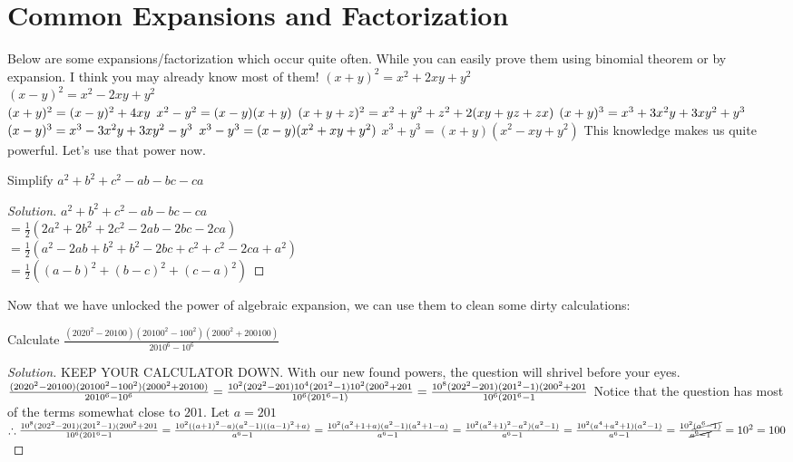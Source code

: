 \section{Common Expansions and Factorization}
Below are some expansions/factorization which occur quite often. While you can easily prove them using binomial theorem or by expansion. I think you may already know most of them!
$(x+y)^2=x^2+2xy+y^2$\\
$(x-y)^2=x^2-2xy+y^2$\\
$(x+y)^2=(x-y)^2 + 4xy\\$
$x^2-y^2=(x-y)(x+y)\\$
$(x+y+z)^2=x^2+y^2+z^2+2(xy+yz+zx)\\$
$(x+y)^3=x^3+3x^2y+3xy^2+y^3\\$
$(x-y)^3=x^3-3x^2y+3xy^2-y^3\\$
$x^3-y^3=(x-y)(x^2+xy+y^2)\\$
$x^3+y^3=(x+y)(x^2-xy+y^2)$
This knowledge makes us quite powerful. Let's use that power now.\\
\begin{example}
Simplify $a^2+b^2+c^2-ab-bc-ca$
\end{example}
\begin{proof}
    [Solution]
    $a^2+b^2+c^2-ab-bc-ca$\\
    $= \frac{1}{2}(2a^2+2b^2+2c^2-2ab-2bc-2ca)$\\
    $= \frac{1}{2}(a^2-2ab+b^2+b^2-2bc+c^2+c^2-2ca+a^2)$\\
    $= \frac{1}{2}((a-b)^2+(b-c)^2+(c-a)^2)$
\end{proof}
Now that we have unlocked the power of algebraic expansion, we can use them to clean some dirty calculations:\\
\begin{example}
    Calculate $\frac{(2020^2-20100)(20100^2-100^2)(2000^2+200100)}{2010^6-10^6}$
\end{example}
\begin{proof}
[Solution]
    KEEP YOUR CALCULATOR DOWN. With our new found powers, the  question will shrivel before your eyes.\\
    $\frac{(2020^2-20100)(20100^2-100^2)(2000^2+20100)}{2010^6-10^6}\\
    = \frac{10^2(202^2-201)10^4(201^2-1)10^2(200^2+201}{10^6(201^6-1)}\\
    = \frac{10^8(202^2-201)(201^2-1)(200^2+201}{10^6(201^6-1}\\$
    Notice that the question has most of the terms somewhat close to $201$. Let $a=201$
    $\therefore \frac{10^8(202^2-201)(201^2-1)(200^2+201}{10^6(201^6-1}\\
    = \frac{10^2((a+1)^2-a)(a^2-1)((a-1)^2+a)}{a^6-1}\\
    = \frac{10^2(a^2+1+a)(a^2-1)(a^2+1-a)}{a^6-1}\\
    = \frac{10^2(a^2+1)^2-a^2)(a^2-1)}{a^6-1}\\
    = \frac{10^2(a^4+a^2+1)(a^2-1)}{a^6-1}\\
    = \frac{10^2\cancel{(a^6-1)}}{\cancel{a^6-1}}\\
    =10^2=100$
\end{proof}
